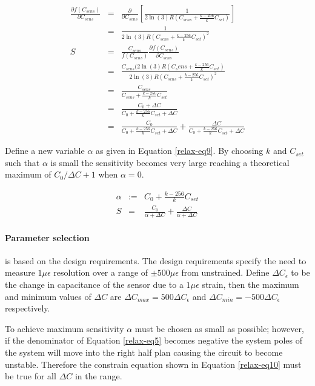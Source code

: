 \begin{eqnarray}
	\frac{\partial f(C_{sens})}{\partial C_{sens}}&=&\frac{\partial}{\partial C_{sens}}\left[\frac{1}{2\ln(3)R(C_{sens}+\frac{k-256}{k}C_{set})}\right]\\
	&=&\frac{1}{2\ln(3)R(C_{sens}+\frac{k-256}{k}C_{set})^2}\label{relax-eq6}\\
	S&=&\frac{C_{sens}}{f(C_{sens})}\frac{\partial f(C_{sens})}{\partial C_{sens}}\\
	&=&\frac{C_{sens}(2\ln(3)R(C_sens+\frac{k-256}{k}C_{set})}{2\ln(3)R(C_{sens}+\frac{k-256}{k}C_{set})^2}\\
	&=&\frac{C_{sens}}{C_{sens}+\frac{k-256}{k}C_{set}}\label{relax-eq7}\\
	&=&\frac{C_0+\Delta C}{C_0+\frac{k-256}{k}C_{set}+\Delta C}\\
	&=&\frac{C_0}{C_0+\frac{k-256}{k}C_{set}+\Delta C}+\frac{\Delta C}{C_0+\frac{k-256}{k}C_{set}+\Delta C}\label{relax-eq8}
\end{eqnarray}

Define a new variable $\alpha$ as given in Equation \ref{relax-eq9}.  By choosing $k$ and $C_{set}$ such that $\alpha$ is small the sensitivity becomes very large reaching a theoretical maximum of $C_0/\Delta C+1$ when $\alpha=0$.

\begin{eqnarray}
	\alpha&:=&C_0+\frac{k-256}{k}C_{set}\label{relax-eq9}\\
	S&=&\frac{C_0}{\alpha+\Delta C}+\frac{\Delta C}{\alpha +\Delta C}\label{relax-sens-eq}
\end{eqnarray}

\paragraph{Parameter selection} is based on the design requirements.  The design requirements specify the need to measure $1\mu\epsilon$ resolution over a range of $\pm500\mu\epsilon$ from unstrained.  Define $\Delta C_\epsilon$ to be the change in capacitance of the sensor due to a $1\mu\epsilon$ strain, then the maximum and minimum values of $\Delta C$ are $\Delta C_{max}=500\Delta C_\epsilon$ and $\Delta C_{min}=-500\Delta C_\epsilon$ respectively.

To achieve maximum sensitivity $\alpha$ must be chosen as small as possible; however, if the denominator of Equation \ref{relax-eq5} becomes negative the system poles of the system will move into the right half plan causing the circuit to become unstable.  Therefore the constrain equation shown in Equation \ref{relax-eq10} must be true for all $\Delta C$ in the range.

